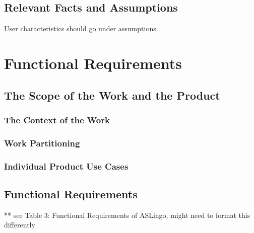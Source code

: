 \documentclass[12pt, titlepage]{article}
\begin{document}
\subsection{Relevant Facts and Assumptions}

User characteristics should go under assumptions.

\newpage

\section{Functional Requirements}

\subsection{The Scope of the Work and the Product}

\subsubsection{The Context of the Work}

\subsubsection{Work Partitioning}

\subsubsection{Individual Product Use Cases}

\subsection{Functional Requirements}
 
** see Table 3: Functional Requirements of ASLingo, might need to format this differently \\
\end{document}
